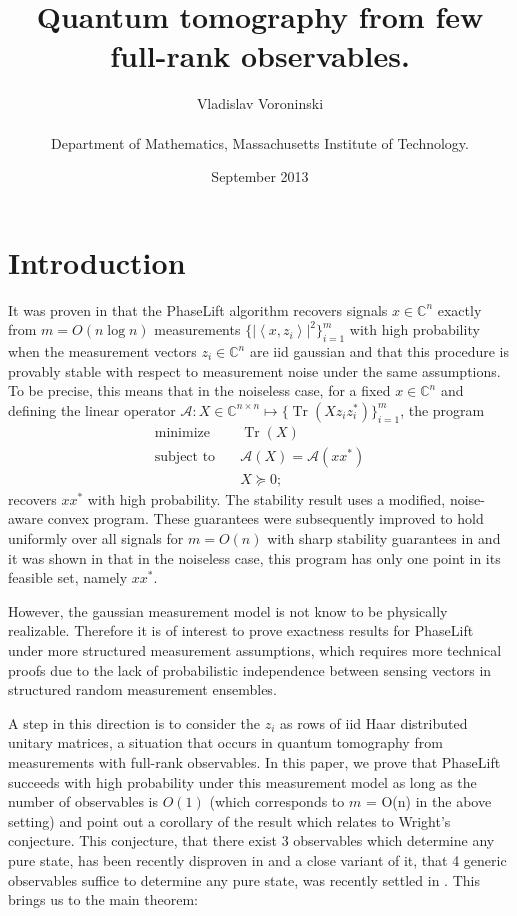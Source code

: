 \documentclass[11pt]{article}
\title{Quantum tomography from few full-rank observables.}
\author{ Vladislav Voroninski\\
  \vspace{-.1cm}\\
  Department of Mathematics, Massachusetts Institute of Technology. 
}
\date{September 2013}
\newcommand{\<}{\langle}
\renewcommand{\>}{\rangle}
\newcommand{\cA}{\mathcal{A}}
\newcommand{\tr}{\operatorname{Tr}}
\newcommand{\trace}{\operatorname{Tr}}
\numberwithin{equation}{section}
\begin{document}
\maketitle




\section{Introduction}

It was proven in \cite{CSV} that the PhaseLift algorithm recovers signals $x \in \mathbb{C}^n$ exactly from $m = O(n \log n)$ measurements $\{\left| \left< x, z_i \right> \right|^2\}_{i=1}^m$ with high probability when the measurement vectors $z_i \in \mathbb{C}^n$ are iid gaussian and that this procedure is provably stable with respect to measurement noise under the same assumptions. To be precise, this means that in the noiseless case, for a fixed $x \in \mathbb{C}^n$ and defining the linear operator $\cA: X \in \mathbb{C}^{n \times n} \mapsto \{\tr(X z_i z_i^*) \}_{i=1}^m$, the program
\begin{equation}
\label{eq:tracemin}
 \begin{array}{ll}
    \text{minimize}   & \quad \trace(X)\\ 
    \text{subject to} & \quad  \cA(X) = \cA(xx^*)\\
& \quad X \succeq 0;  
\end{array}
\end{equation}
recovers $xx^*$ with high probability. The stability result uses a modified, noise-aware convex program. These guarantees were subsequently improved to hold uniformly over all signals for $m = O(n)$ with sharp stability guarantees in \cite{Five} and it was shown in \cite{SOR} that in the noiseless case, this program has only one point in its feasible set, namely $xx^*$. 

However, the gaussian measurement model is not know to be physically realizable. Therefore it is of interest to prove exactness results for PhaseLift under more structured measurement assumptions, which requires more technical proofs due to the lack of probabilistic independence between sensing vectors in structured random measurement ensembles. 

A step in this direction is to consider the $z_i$ as rows of iid Haar distributed unitary matrices, a situation that occurs in quantum tomography from measurements with full-rank observables. In this paper, we prove that PhaseLift succeeds with high probability under this measurement model as long as the number of observables is $O(1)$ (which corresponds to $m$ = O(n) in the above setting) and point out a corollary of the result which relates to Wright's conjecture. This conjecture, that there exist 3 observables which determine any pure state, has been recently disproven in \cite{HMW11, DMBlog} and a close variant of it, that 4 generic observables suffice to determine any pure state, was recently settled in \cite{DAP}. This brings us to the main theorem:
\end{document}
